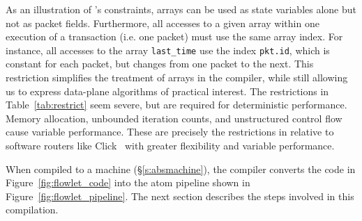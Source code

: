 As an illustration of \pktlanguage's constraints, arrays can be used as state
variables alone but not as packet fields.  Furthermore, all accesses to a given
array within one execution of a transaction (i.e. one packet) must use the same
array index. For instance, all accesses to the array \texttt{last\_time} use
the index \texttt{pkt.id}, which is constant for each packet, but changes from
one packet to the next. This restriction simplifies the treatment of arrays in
the compiler, while still allowing us to express data-plane algorithms of
practical interest. The restrictions in Table~\ref{tab:restrict} seem severe,
but are required for deterministic performance.  Memory allocation, unbounded
iteration counts, and unstructured control flow cause variable performance.
These are precisely the restrictions in \pktlanguage relative to software
routers like Click~\cite{click} with greater flexibility and variable
performance.

When compiled to a \absmachine machine (\S\ref{s:absmachine}), the \pktlanguage
compiler converts the code in Figure~\ref{fig:flowlet_code} into the atom
pipeline shown in Figure~\ref{fig:flowlet_pipeline}. The next section describes
the steps involved in this compilation.
%
